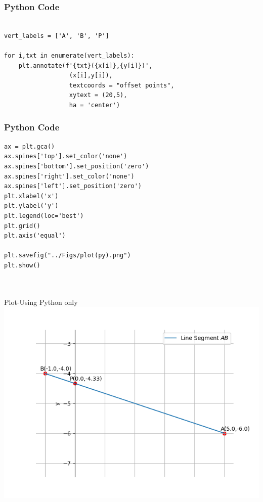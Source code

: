 \documentclass{beamer}
\begin{document}
\begin{frame}[fragile]
    \frametitle{Python Code}
    \begin{lstlisting}

vert_labels = ['A', 'B', 'P']

for i,txt in enumerate(vert_labels):
    plt.annotate(f'{txt}({x[i]},{y[i]})',
                  (x[i],y[i]),
                  textcoords = "offset points",
                  xytext = (20,5),
                  ha = 'center')
\end{lstlisting}
\end{frame}

\begin{frame}[fragile]
    \frametitle{Python Code}
    \begin{lstlisting}
ax = plt.gca()
ax.spines['top'].set_color('none')
ax.spines['bottom'].set_position('zero')
ax.spines['right'].set_color('none')
ax.spines['left'].set_position('zero')
plt.xlabel('x')
plt.ylabel('y')
plt.legend(loc='best')
plt.grid()
plt.axis('equal')

plt.savefig("../Figs/plot(py).png")
plt.show()



    \end{lstlisting}
\end{frame}


\begin{frame}{Plot-Using Python only}
    \centering
    \includegraphics[width=\columnwidth, height=0.8\textheight, keepaspectratio]{Figs/plot(py).png}     
\end{frame}
\end{document}
